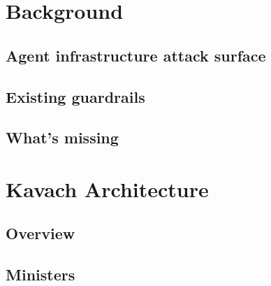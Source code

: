 \documentclass[11pt]{article}
\begin{document}
\section{Background}
\label{sec:background}

\subsection{Agent infrastructure attack surface}

\subsection{Existing guardrails}

\subsection{What's missing}

\section{Kavach Architecture}
\label{sec:architecture}

\subsection{Overview}

\subsection{Ministers}
\end{document}
